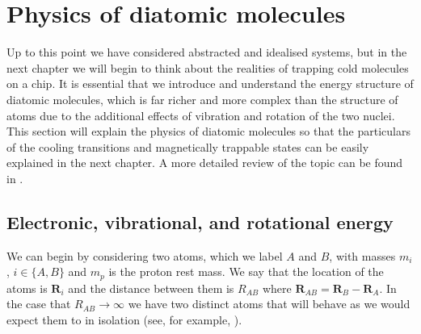 \section{Physics of diatomic molecules}
\label{theory:molecules}

Up to this point we have considered abstracted and idealised systems, but in
the next chapter we will begin to think about the realities of trapping cold
molecules on a chip. It is essential that we introduce and understand the
energy structure of diatomic molecules, which is far richer and more complex
than the structure of atoms due to the additional effects of vibration and
rotation of the two nuclei. This section will explain the physics of diatomic
molecules so that the particulars of the cooling transitions and magnetically
trappable states can be easily explained in the next chapter. A more
detailed review of the topic can be found in .

\subsection{Electronic, vibrational, and rotational energy}

We can begin by considering two atoms, which we label $A$ and $B$,
with masses  $m_i$, $i\in\{A,B\}$ and $m_p$ is the proton rest mass. We say that the location of the
atoms is $\mathbf{R}_i$ and the distance between them is
$R_{AB}$ where $\mathbf{R}_{AB} = \mathbf{R}_B - \mathbf{R}_A$. In the case
that $R_{AB} \rightarrow \infty$ we have two distinct atoms that will behave 
as we would expect them to in isolation (see, for example,
).

